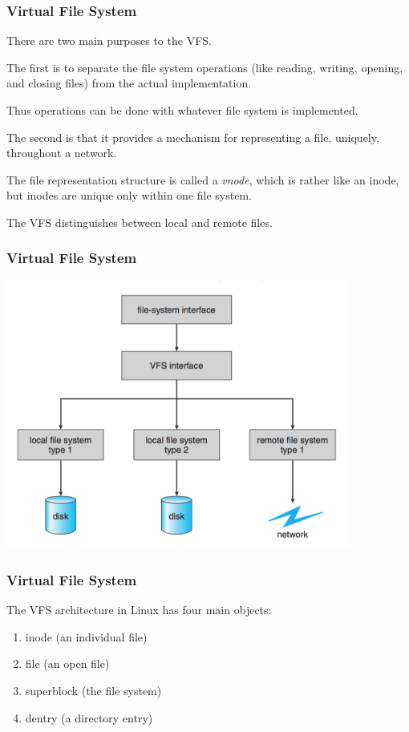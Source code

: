 \begin{frame}
\frametitle{Virtual File System}

There are two main purposes to the VFS. 

The first is to separate the file system operations (like reading, writing, opening, and closing files) from the actual implementation. 

Thus operations can be done with whatever file system is implemented. 

The second is that it provides a mechanism for representing a file, uniquely, throughout a network. 

The file representation structure is called a \textit{vnode}, which is rather like an inode, but inodes are unique only within one file system. 

The VFS distinguishes between local and remote files.

\end{frame}

\begin{frame}
\frametitle{Virtual File System}

\begin{center}
	\includegraphics[width=0.85\textwidth]{images/vfs.png}
\end{center}


\end{frame}

\begin{frame}
\frametitle{Virtual File System}

The VFS architecture in Linux has four main objects:

\begin{enumerate}
	\item inode (an individual file)
	\item file (an open file)
	\item superblock (the file system)
	\item dentry (a directory entry)
\end{enumerate}



\end{frame}

